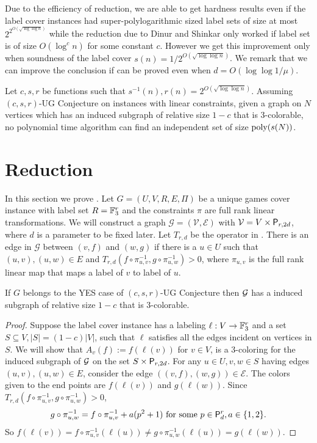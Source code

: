 Due to the efficiency of reduction, we are
able to get hardness results even if the label cover instances had
super-polylogarithmic sized label sets of size at most $2^{2^{O(\sqrt{\log \log
n})}}$ while the reduction due to Dinur and Shinkar only worked if label set is
of size $O(\log^c n)$ for some constant $c$. However we get this improvement
only when soundness of the label cover $s(n) = 1/2^{O(\sqrt{\log \log n})}$.
 We remark that we can
improve the conclusion if  can be proved even when
$d = O(\log \log 1/\mu)$.


\begin{corollary}\label{cor:main} 
Let $c,s,r$ be functions such that
$s^{-1}(n),r(n) = 2^{O(\sqrt {\log \log n})}$. Assuming $(c,s,r)$-UG Conjecture
on instances with linear constraints, given a graph on $N$ vertices which has an
induced subgraph of relative size $1-c$ that is $3$-colorable, no polynomial
time algorithm can find an independent set of size $\poly(s(N))$.
\end{corollary}

\section{Reduction}

In this section we prove . Let $G =(U,V,R,E,\Pi)$ be
a unique games cover instance with label set $R=\F_3^r$ and the constraints
$\pi$ are full rank linear transformations. We will construct a graph
$\mathcal{G=(V,E)}$ with $\mathcal V= V\times \Pe_{r,2d}$, where $d$ is a
parameter to be fixed later. Let $T_{r,d}$ be the operator in
. There is an edge in $\mathcal G$ between $(v,f)$ and
$(w,g)$ if there is a $u\in U$ such that $(u,v), (u,w) \in E$ and
$T_{r,d}(f\circ\pi^{-1}_{u,v},g \circ \pi^{-1}_{u,w}) >0$, where $\pi_{u,v}$ is
the full rank linear map that maps a label of $v$ to label of $u$.

\begin{lemma}[Completeness]\label{lem:completeness}
 If $G$ belongs to the YES
case of $(c,s,r)$-UG Conjecture then $\cal G$ has a induced subgraph of relative
size $1-c$ that is $3$-colorable. 
\end{lemma} 
\begin{proof} 
Suppose the label
cover instance has a labeling $\ell: V \rightarrow \F_3^r$ and a set $S
\subseteq V, |S| = (1-c)|V|$, such that $\ell$ satisfies all the edges incident
on vertices in $S$. We will show that $A_v(f):=f(\ell(v))$ for $v\in V$, is a
$3$-coloring for the induced subgraph of $\cal G$ on the set $S \times
\Pe_{r,2d}$. For any $u \in U, v,w \in S$ having edges $(u,v),(u,w)\in E$,
consider the edge $((v,f),(w,g)) \in \mathcal E$. The colors given to the end
points are $f(\ell(v))$ and $g(\ell(w))$. Since
$T_{r,d}(f\circ\pi^{-1}_{u,v},g\circ \pi^{-1}_{u,w}) >0$, $$g\circ
\pi^{-1}_{u,w} = f\circ \pi^{-1}_{u,v} + a(p^2 +1) \text{ for some } p \in
\Pe^r_d, a \in \{1,2\}.$$ So $f(\ell(v))= f \circ \pi_{u,v}^{-1}(\ell(u)) \neq
g\circ \pi_{u,w}^{-1}(\ell(u)) = g (\ell(w))$.
\end{proof}

